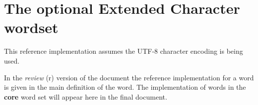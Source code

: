 \section{The optional Extended Character wordset} %

This reference implementation assumes the UTF-8 character encoding
is being used.

\ifinline
	\begin{editor}
		In the \emph{review} (r) version of the document the
		reference implementation for a word is given in the main
		definition of the word.  The implementation of words
		in the \textbf{core} word set will appear here in the
		final document.
	\end{editor}
\else
	
\fi
